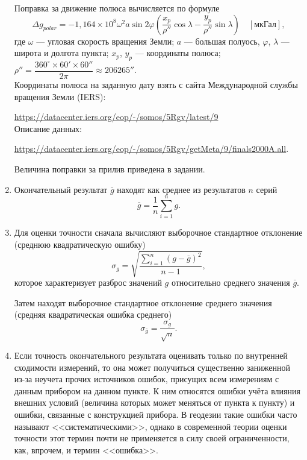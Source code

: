 \documentclass[12pt, a4paper]{article}
\theoremstyle{remark}
\renewcommand{\phi}{\ensuremath{\varphi}}
\begin{document}
\begin{enumerate}
Поправка за движение полюса вычисляется по формуле
\begin{equation*}
    \Delta g_{polar} = - 1,164\times 10^8 \omega^2 a \sin{2\phi} \left( \dfrac{x_p}{\rho''} \cos\lambda -
    \dfrac{y_p}{\rho''}\sin\lambda \right)\quad[\text{мкГал}],
\end{equation*}
где $\omega$ --- угловая скорость вращения Земли; $a$ --- большая полуось, $\phi$, $\lambda$ --- широта
и долгота пункта; $x_p$, $y_p$ --- координаты полюса; $\rho'' = \dfrac{360^\circ \times 60'
\times 60''}{2\pi} \approx 206265''$.\\
Координаты полюса на заданную дату взять с сайта Международной службы вращения Земли (IERS):\par
\url{https://datacenter.iers.org/eop/-/somos/5Rgv/latest/9}\\
Описание данных:\par
\url{https://datacenter.iers.org/eop/-/somos/5Rgv/getMeta/9/finals2000A.all}.

Величина поправки за прилив приведена в задании. 

\item Окончательный результат $\bar{g}$ находят как среднее из результатов $n$ серий
    \begin{equation}
        \label{eq:mean}
        \bar{g} = \dfrac{1}{n}\sum\limits_{i=1}^{n} g.
    \end{equation}

\item Для оценки точности сначала вычисляют выборочное стандартное отклонение (среднюю
    квадратическую ошибку)
    \begin{equation}
        \sigma_g = \sqrt{\dfrac{\sum\limits_{i = 1}^n \left( g - \bar{g} \right)^2}{n-1}},
    \end{equation}
    которое характеризует разброс значений $g$ относительно среднего значения $\bar{g}$. 

    Затем находят выборочное стандартное отклонение среднего значения (средняя квадратическая ошибка
    среднего)
    \begin{equation}
        \label{eq:stdm}
        \sigma_{\bar{g}} = \dfrac{\sigma_g}{\sqrt{n}}.
    \end{equation}
\item Если точность окончательного результата оценивать только по внутренней сходимости измерений,
    то она может получиться существенно заниженной из-за неучета прочих источников ошибок, присущих
    всем измерениям с данным прибором на данном пункте. К ним относятся ошибки учёта влияния внешних
    условий (величина которых может меняться от пункта к пункту) и ошибки, связанные с конструкцией
    прибора. В геодезии такие ошибки часто называют <<систематическими>>, однако в современной теории
    оценки точности этот термин почти не применяется в силу своей ограниченности, как, впрочем, и
    термин <<ошибка>>.


\end{enumerate}
\end{document}
